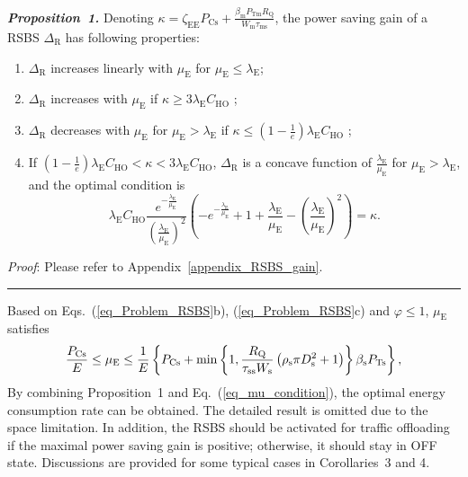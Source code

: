 \documentclass[12pt, draftclsnofoot,onecolumn]{IEEEtran}
\begin{document}
\emph{\textbf{Proposition~1.}} Denoting $\kappa = \zeta_\mathrm{EE} P_\mathrm{Cs} + \frac{\beta_\mathrm{m} P_\mathrm{Tm} R_\mathrm{Q}}{W_\mathrm{m} \tau_\mathrm{ms}}$, the power saving gain of a RSBS $\Delta_\mathrm{R}$ has following properties:
\begin{enumerate}
  \item $\Delta_\mathrm{R}$ increases linearly with $\mu_\mathrm{E}$ for $\mu_\mathrm{E}\leq \lambda_\mathrm{E}$;
  \item $\Delta_\mathrm{R}$ increases with $\mu_\mathrm{E}$ if $\kappa \geq 3 \lambda_\mathrm{E} C_\mathrm{HO}$ ;
  \item $\Delta_\mathrm{R}$ decreases with $\mu_\mathrm{E}$ for $\mu_\mathrm{E} > \lambda_\mathrm{E}$ if $\kappa \leq (1-\frac{1}{e}) \lambda_\mathrm{E} C_\mathrm{HO}$ ;
  \item If $(1-\frac{1}{e}) \lambda_\mathrm{E} C_\mathrm{HO} < \kappa < 3 \lambda_\mathrm{E} C_\mathrm{HO}$, $\Delta_\mathrm{R}$ is a concave function of $\frac{\lambda_\mathrm{E}}{\mu_\mathrm{E}}$ for $\mu_\mathrm{E} > \lambda_\mathrm{E}$, and the optimal condition is
      \begin{equation}\label{eq_opt_mu_RSBS}
        \lambda_\mathrm{E}C_\mathrm{HO} \frac{e^{-\frac{\lambda_\mathrm{E}}{\mu_\mathrm{E}}}}{\left(\frac{\lambda_\mathrm{E}}{\mu_\mathrm{E}}\right)^2} \left( -e^{-\frac{\lambda_\mathrm{E}}{\mu_\mathrm{E}}} +1+\frac{\lambda_\mathrm{E}}{\mu_\mathrm{E}}-\left(\frac{\lambda_\mathrm{E}}{\mu_\mathrm{E}}\right)^2 \right) =  \kappa.
      \end{equation}
\end{enumerate}
\emph{Proof}: Please refer to Appendix~\ref{appendix_RSBS_gain}.
\hfill \rule{4pt}{8pt}

Based on Eqs.~(\ref{eq_Problem_RSBS}b), (\ref{eq_Problem_RSBS}c) and $\varphi \leq 1$, $\mu_\mathrm{E}$ satisfies
\begin{equation}\label{eq_mu_condition}\footnotesize
    \frac{P_{\mathrm{Cs}}}{E} \leq \mu_\mathrm{E} \leq \frac{1}{E} \left\{ P_{\mathrm{Cs}}+ \min \left\{1, \frac{R_\mathrm{Q}}{\tau_\mathrm{ss} W_\mathrm{s}}\left(\rho_\mathrm{s}\pi D_\mathrm{s}^2 +1 \right) \right\} \beta_\mathrm{s} P_\mathrm{Ts} \right\},
\end{equation}
By combining Proposition~1 and Eq.~(\ref{eq_mu_condition}), the optimal energy consumption rate can be obtained.
The detailed result is omitted due to the space limitation.
In addition, the RSBS should be activated for traffic offloading if the maximal power saving gain is positive; otherwise, it should stay in OFF state.
Discussions are provided for some typical cases in Corollaries~3 and 4.
\end{document}
